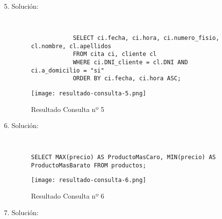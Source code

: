 \begin{enumerate}
    \setcounter{enumi}{4}
    \item Solución:

    \begin{figure}[H]
        \begin{tcolorbox}[sharp corners, colback=yellow!30, colframe=white!20]
            \scriptsize
            \begin{verbatim}


            SELECT ci.fecha, ci.hora, ci.numero_fisio, cl.nombre, cl.apellidos
            FROM cita ci, cliente cl
            WHERE ci.DNI_cliente = cl.DNI AND ci.a_domicilio = "si"
            ORDER BY ci.fecha, ci.hora ASC;
            \end{verbatim}
        \end{tcolorbox}
    \end{figure}

    \begin{figure}[H]
        \centering
        \texttt{[image: resultado-consulta-5.png]}
        \caption{Resultado Consulta nº 5}
    \end{figure}

    \item Solución:

      \begin{figure}[H]
        \begin{tcolorbox}[sharp corners, colback=yellow!30, colframe=white!20]
            \scriptsize
            \begin{verbatim}


SELECT MAX(precio) AS ProductoMasCaro, MIN(precio) AS ProductoMasBarato FROM productos;
            \end{verbatim}
        \end{tcolorbox}
    \end{figure}

    \begin{figure}[H]
        \centering
        \texttt{[image: resultado-consulta-6.png]}
        \caption{Resultado Consulta nº 6}
    \end{figure}

    \item Solución:

    \begin{figure}[H]
        \begin{tcolorbox}[sharp corners, colback=yellow!30, colframe=white!20]
            \scriptsize
            \begin{verbatim}



\end{verbatim}
\end{tcolorbox}
\end{figure}
\end{enumerate}
